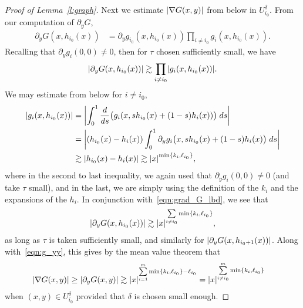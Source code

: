 \documentclass[10pt]{amsart}
\theoremstyle{definition}\newtheorem{defi}[theo]{Definition}\newtheorem{rema}[theo]{Remark}\newtheorem{exam}[theo]{Example}\newtheorem{exem}[theo]{Example}\newtheorem{nota}[theo]{Notation}
\newcommand{\abs}[1]{\left \lvert #1 \right \rvert}
\let\originalleft\left
\let\originalright\right
\renewcommand{\left}{\mathopen{}\mathclose\bgroup\originalleft}
\renewcommand{\right}{\aftergroup\egroup\originalright}
\begin{document}
\begin{proof}[Proof of Lemma~\ref{l:graph}]
Next we estimate $\abs{\nabla G(x,y)}$ from below in $U_{i_0}^\delta$. From our computation of $\partial_y G$,
\begin{align*}
\partial_y G(x, h_{i_0}(x)) & = \partial_y g_{i_0}(x, h_{i_0}(x)) \prod_{i \ne i_0} g_i(x, h_{i_0}(x)).
\end{align*}
Recalling that $\partial_y g_i(0,0) \ne 0$, then for $ \tau$ chosen sufficiently small, we have
\begin{align}
\abs{ \partial_y G(x, h_{i_0}(x))} \gtrsim \prod_{i \ne i_0} \abs{g_i(x, h_{i_0}(x))}. \label{eqn:grad_G_lbd}
\end{align}
We may estimate from below for $i \ne i_0$,
\begin{equation}\label{eqn:gi_lbd}
\begin{aligned}[t]
\abs{g_i(x, h_{i_0}(x))} & = \abs{\int_0^1 \frac{d}{ds} \bigl(g_i(x, sh_{i_0}(x) + (1-s) h_i(x)) \bigr) \; ds } \\
& = \abs{\left(h_{i_0}(x) - h_i(x) \right) \int_0^1 \partial_y g_i\bigl(x, sh_{i_0}(x) + (1-s) h_i(x)\bigr) \; ds} \\
& \gtrsim \abs{h_{i_0}(x) - h_i(x)} \gtrsim \abs{x}^{\min\{ k_i, \ell_{i_0}\}},
\end{aligned}
\end{equation}
where in the second to last inequality, we again used that $\partial_y g_i(0,0) \ne 0$ (and take $\tau$ small), and in the last, we are simply using the definition of the $k_i$ and the expansions of the $h_i$. In conjunction with~\eqref{eqn:grad_G_lbd}, we see that
\begin{align*}
\abs{\partial_y G(x, h_{i_0}(x))} \gtrsim \abs{x}^{\sum\limits_{i \ne i_0} \min \{k_i, \ell_{i_0} \}},
\end{align*}
as long as $\tau$ is taken sufficiently small, and similarly for $\abs{\partial_y G(x, h_{i_0+1}(x))}$. Along with~\eqref{eqn:g_yy}, this gives by the mean value theorem that
\begin{equation}\label{eqn:grad_G_lbd2}
\begin{split}
\abs{\nabla G(x, y)} \ge \abs{\partial_y G(x,y)} & \gtrsim \abs{x}^{\sum\limits_{i =1}^m \min \{k_i, \ell_{i_0} \} - \ell_{i_0}} = \abs{x}^{\sum\limits_{i \ne i_0}^m \min \{k_i, \ell_{i_0} \}}
\end{split}
\end{equation}
when $(x,y) \in U_{i_0}^\delta$ provided that $\delta$ is chosen small enough.


\end{proof}
\end{document}
